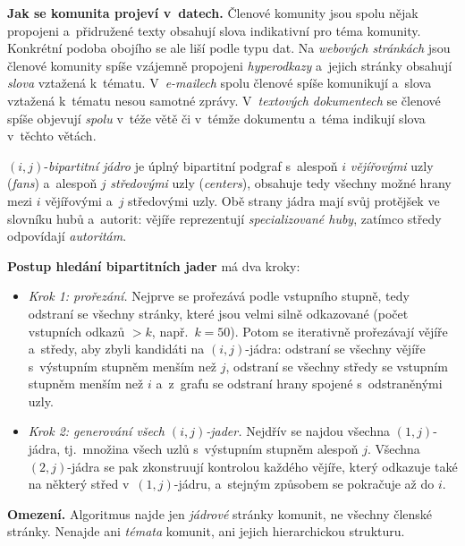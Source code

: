 \documentclass[11pt,a4paper]{article}
\theoremstyle{definition}
\begin{document}
\textbf{Jak se komunita projeví v~datech.} Členové komunity jsou spolu nějak propojeni
a~přidružené texty obsahují slova indikativní pro téma komunity. Konkrétní podoba obojího se
ale liší podle typu dat. Na \emph{webových stránkách} jsou členové komunity spíše vzájemně
propojeni \emph{hyperodkazy} a~jejich stránky obsahují \emph{slova} vztažená k~tématu.
V~\emph{e-mailech} spolu členové spíše komunikují a~slova vztažená k~tématu nesou samotné
zprávy. V~\emph{textových dokumentech} se členové spíše objevují \emph{spolu} v~téže větě či
v~témže dokumentu a~téma indikují slova v~těchto větách.

\begin{defbox}
$(i,j)$-\emph{bipartitní jádro} je úplný bipartitní podgraf s~alespoň $i$ \emph{vějířovými}
uzly (\emph{fans}) a~alespoň $j$ \emph{středovými} uzly (\emph{centers}), obsahuje tedy všechny
možné hrany mezi $i$ vějířovými a~$j$ středovými uzly. Obě strany jádra mají svůj protějšek
ve slovníku hubů a~autorit: vějíře reprezentují \emph{specializované huby}, zatímco středy
odpovídají \emph{autoritám}.

\textbf{Postup hledání bipartitních jader} má dva kroky:
\begin{itemize}
\item \emph{Krok 1: prořezání.} Nejprve se prořezává podle vstupního stupně, tedy odstraní se
      všechny stránky, které jsou velmi silně odkazované (počet vstupních odkazů $>k$, např.\
      $k=50$). Potom se iterativně prořezávají vějíře a~středy, aby zbyli kandidáti na
      $(i,j)$-jádra: odstraní se všechny vějíře s~výstupním stupněm menším než $j$, odstraní se
      všechny středy se vstupním stupněm menším než $i$ a~z~grafu se odstraní hrany spojené
      s~odstraněnými uzly.
\item \emph{Krok 2: generování všech $(i,j)$-jader.} Nejdřív se najdou všechna $(1,j)$-jádra,
      tj.\ množina všech uzlů s~výstupním stupněm alespoň $j$. Všechna $(2,j)$-jádra se pak
      zkonstruují kontrolou každého vějíře, který odkazuje také na některý střed
      v~$(1,j)$-jádru, a~stejným způsobem se pokračuje až do $i$.
\end{itemize}
\textbf{Omezení.} Algoritmus najde jen \emph{jádrové} stránky komunit, ne všechny členské
stránky. Nenajde ani \emph{témata} komunit, ani jejich hierarchickou strukturu.
\end{defbox}
\end{document}
